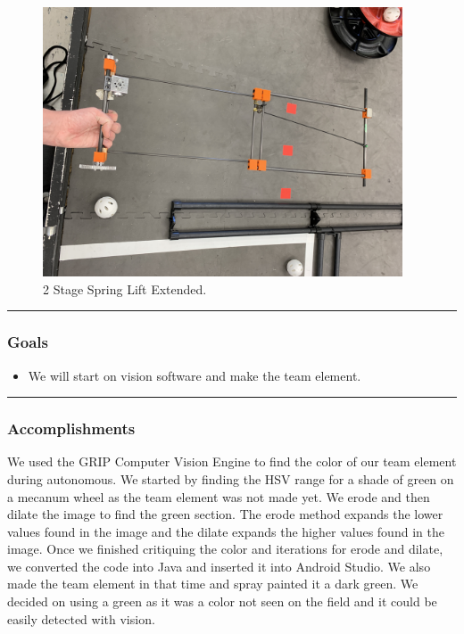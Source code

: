 \begin{figure}[htp]
\centering
  \includegraphics[width=0.95\textwidth]{Meetings/October/10-28-21/10-28-21_Hardware_Figure3 - Nathan Forrer.JPG}
  \caption{2 Stage Spring Lift Extended.}
  \label{fig:pic3}
\end{figure}

\noindent\hfil\rule{\textwidth}{.4pt}\hfil
\subsubsection*{Goals}
\begin{itemize}
    \item We will start on vision software and make the team element.

\end{itemize} 

\noindent\hfil\rule{\textwidth}{.4pt}\hfil

\subsubsection*{Accomplishments}
We used the GRIP Computer Vision Engine to find the color of our team element during autonomous. We started by finding the HSV range for a shade of green on a mecanum wheel as the team element was not made yet. We erode and then dilate the image to find the green section. The erode method expands the lower values found in the image and the dilate expands the higher values found in the image. Once we finished critiquing the color and iterations for erode and dilate, we converted the code into Java and inserted it into Android Studio. We also made the team element in that time and spray painted it a dark green. We decided on using a green as it was a color not seen on the field and it could be easily detected with vision.


